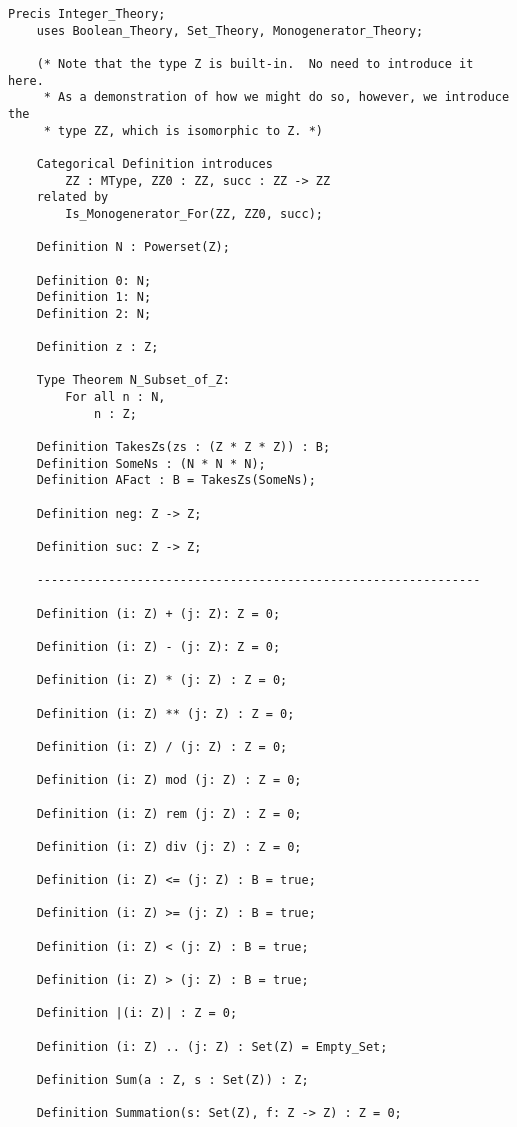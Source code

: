 \begin{lstlisting}[language=resolve]
Precis Integer_Theory;
    uses Boolean_Theory, Set_Theory, Monogenerator_Theory;

	(* Note that the type Z is built-in.  No need to introduce it here.
	 * As a demonstration of how we might do so, however, we introduce the
	 * type ZZ, which is isomorphic to Z. *)

	Categorical Definition introduces
		ZZ : MType, ZZ0 : ZZ, succ : ZZ -> ZZ
	related by
		Is_Monogenerator_For(ZZ, ZZ0, succ);

	Definition N : Powerset(Z);

	Definition 0: N;
	Definition 1: N;
	Definition 2: N;

	Definition z : Z;

	Type Theorem N_Subset_of_Z:
		For all n : N,
			n : Z;

	Definition TakesZs(zs : (Z * Z * Z)) : B;
	Definition SomeNs : (N * N * N);
	Definition AFact : B = TakesZs(SomeNs);

    Definition neg: Z -> Z;

    Definition suc: Z -> Z;

    --------------------------------------------------------------

    Definition (i: Z) + (j: Z): Z = 0;

    Definition (i: Z) - (j: Z): Z = 0;

    Definition (i: Z) * (j: Z) : Z = 0;

    Definition (i: Z) ** (j: Z) : Z = 0;

    Definition (i: Z) / (j: Z) : Z = 0;

    Definition (i: Z) mod (j: Z) : Z = 0;

    Definition (i: Z) rem (j: Z) : Z = 0;

    Definition (i: Z) div (j: Z) : Z = 0;

    Definition (i: Z) <= (j: Z) : B = true;

    Definition (i: Z) >= (j: Z) : B = true;

    Definition (i: Z) < (j: Z) : B = true;

    Definition (i: Z) > (j: Z) : B = true;

    Definition |(i: Z)| : Z = 0;

    Definition (i: Z) .. (j: Z) : Set(Z) = Empty_Set;

	Definition Sum(a : Z, s : Set(Z)) : Z;

    Definition Summation(s: Set(Z), f: Z -> Z) : Z = 0;


\end{lstlisting}
